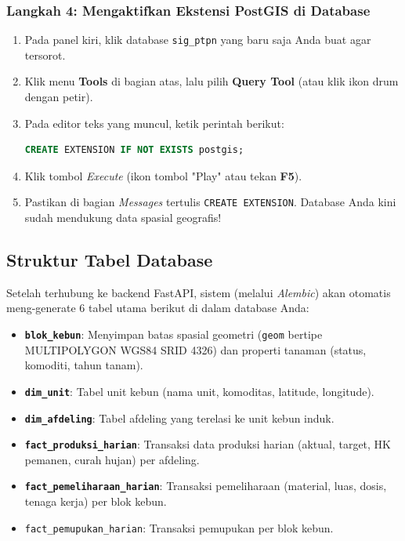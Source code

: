 \documentclass[12pt, a4paper]{article}
\begin{document}
\subsubsection*{Langkah 4: Mengaktifkan Ekstensi PostGIS di Database}
\begin{enumerate}
    \item Pada panel kiri, klik database \texttt{sig\_ptpn} yang baru saja Anda buat agar tersorot.
    \item Klik menu \textbf{Tools} di bagian atas, lalu pilih \textbf{Query Tool} (atau klik ikon drum dengan petir).
    \item Pada editor teks yang muncul, ketik perintah berikut:
    \begin{lstlisting}[language=SQL]
CREATE EXTENSION IF NOT EXISTS postgis;
    \end{lstlisting}
    \item Klik tombol \textit{Execute} (ikon tombol "Play" atau tekan \textbf{F5}).
    \item Pastikan di bagian \textit{Messages} tertulis \texttt{CREATE EXTENSION}. Database Anda kini sudah mendukung data spasial geografis!
\end{enumerate}

\subsection{Struktur Tabel Database}
Setelah terhubung ke backend FastAPI, sistem (melalui \textit{Alembic}) akan otomatis meng-generate 6 tabel utama berikut di dalam database Anda:
\begin{itemize}
    \item \textbf{\texttt{blok\_kebun}}: Menyimpan batas spasial geometri (\texttt{geom} bertipe MULTIPOLYGON WGS84 SRID 4326) dan properti tanaman (status, komoditi, tahun tanam).
    \item \textbf{\texttt{dim\_unit}}: Tabel unit kebun (nama unit, komoditas, latitude, longitude).
    \item \textbf{\texttt{dim\_afdeling}}: Tabel afdeling yang terelasi ke unit kebun induk.
    \item \textbf{\texttt{fact\_produksi\_harian}}: Transaksi data produksi harian (aktual, target, HK pemanen, curah hujan) per afdeling.
    \item \textbf{\texttt{fact\_pemeliharaan\_harian}}: Transaksi pemeliharaan (material, luas, dosis, tenaga kerja) per blok kebun.
    \item \texttt{fact\_pemupukan\_harian}: Transaksi pemupukan per blok kebun.
\end{itemize}
\end{document}
